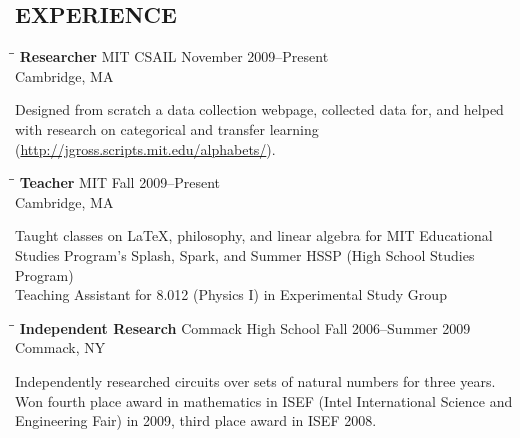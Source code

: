 \documentclass{res}
\begin{document}
\begin{resume}
\section{EXPERIENCE}
   \vspace{-0.1in}	
   \begin{tabbing}
   \hspace{2.3in}\= \hspace{2.6in}\= \kill %
    {\bf Researcher} \>MIT CSAIL     \>November 2009--Present\\
                             \>Cambridge, MA
   \end{tabbing}\vspace{-20pt}      %
    Designed from scratch a data collection webpage, collected data for, and helped with research on categorical and transfer learning (\url{http://jgross.scripts.mit.edu/alphabets/}).
   \begin{tabbing}
   \hspace{2.3in}\= \hspace{2.6in}\= \kill %
    {\bf Teacher} \>MIT     \>Fall 2009--Present\\
                             \>Cambridge, MA
   \end{tabbing}\vspace{-20pt}      %
    Taught classes on \LaTeX, philosophy, and linear algebra for MIT Educational Studies Program's Splash, Spark, and Summer HSSP (High School Studies Program) \\
    Teaching Assistant for 8.012 (Physics I) in Experimental Study Group
   \begin{tabbing}
   \hspace{2.3in}\= \hspace{2.6in}\= \kill %
    {\bf Independent Research} \>Commack High School     \>Fall 2006--Summer 2009\\
                             \>Commack, NY
   \end{tabbing}\vspace{-20pt}      %
    Independently researched circuits over sets of natural numbers for three years. \\
    Won fourth place award in mathematics in ISEF (Intel International Science and Engineering Fair) in 2009, third place award in ISEF 2008.
    

\end{resume}
\end{document}
